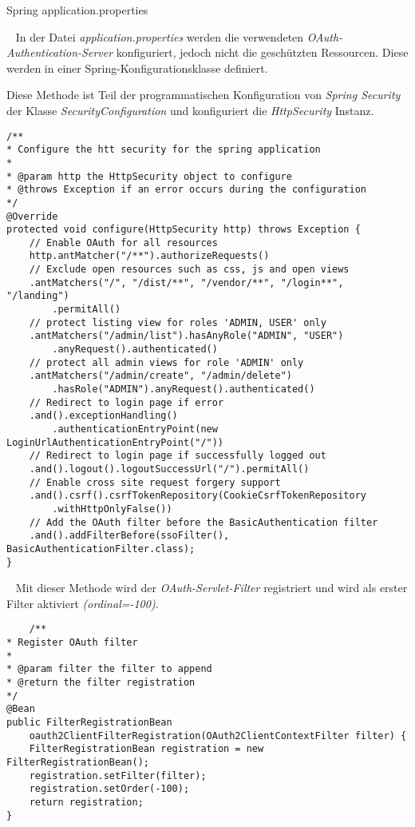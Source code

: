 \begin{code}
	\caption{Spring application.properties}
	\label{source:epidemiology-logistic}
\end{code}
\ \newline
\newline
In der Datei \emph{application.properties} werden die verwendeten \emph{OAuth-Authentication-Server} konfiguriert, jedoch nicht die geschützten Ressourcen. Diese werden in einer Spring-Konfigurationsklasse definiert.
\newpage

Diese Methode ist Teil der programmatischen Konfiguration von \emph{Spring Security} der Klasse \emph{SecurityConfiguration} und konfiguriert die \emph{HttpSecurity} Instanz.
\begin{verbatim}
/**
* Configure the htt security for the spring application
*
* @param http the HttpSecurity object to configure
* @throws Exception if an error occurs during the configuration
*/
@Override
protected void configure(HttpSecurity http) throws Exception {
	// Enable OAuth for all resources
	http.antMatcher("/**").authorizeRequests()
	// Exclude open resources such as css, js and open views
	.antMatchers("/", "/dist/**", "/vendor/**", "/login**", "/landing")
		.permitAll()
	// protect listing view for roles 'ADMIN, USER' only
	.antMatchers("/admin/list").hasAnyRole("ADMIN", "USER")
		.anyRequest().authenticated()
	// protect all admin views for role 'ADMIN' only
	.antMatchers("/admin/create", "/admin/delete")
		.hasRole("ADMIN").anyRequest().authenticated()
	// Redirect to login page if error
	.and().exceptionHandling()
		.authenticationEntryPoint(new LoginUrlAuthenticationEntryPoint("/"))
	// Redirect to login page if successfully logged out
	.and().logout().logoutSuccessUrl("/").permitAll()
	// Enable cross site request forgery support
	.and().csrf().csrfTokenRepository(CookieCsrfTokenRepository
		.withHttpOnlyFalse())
	// Add the OAuth filter before the BasicAuthentication filter
	.and().addFilterBefore(ssoFilter(), BasicAuthenticationFilter.class);
}
\end{verbatim}
\ \newline
Mit dieser Methode wird der \emph{OAuth-Servlet-Filter} registriert und wird als erster Filter aktiviert \emph{(ordinal=-100)}.
\begin{verbatim}
    /**
* Register OAuth filter
*
* @param filter the filter to append
* @return the filter registration
*/
@Bean
public FilterRegistrationBean 
	oauth2ClientFilterRegistration(OAuth2ClientContextFilter filter) {
	FilterRegistrationBean registration = new FilterRegistrationBean();
	registration.setFilter(filter);
	registration.setOrder(-100);
	return registration;
}
\end{verbatim}
\ \newpage


